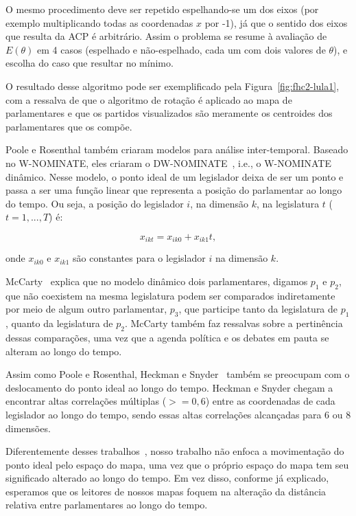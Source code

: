 \documentclass[a4paper, 12pt]{article}
\newcommand\wnominate{W-NOMINATE\xspace}
\begin{document}
O mesmo procedimento deve ser repetido espelhando-se um dos eixos (por exemplo multiplicando todas as coordenadas $x$ por -1), já que o sentido dos eixos que resulta da ACP é arbitrário. Assim o problema se resume à avaliação de $E(\theta)$ em 4 casos (espelhado e não-espelhado, cada um com dois valores de $\theta$), e escolha do caso que resultar no mínimo.

O resultado desse algoritmo pode ser exemplificado pela Figura~\ref{fig:fhc2-lula1}, com a ressalva de que o algoritmo de rotação é aplicado ao mapa de parlamentares e que os partidos visualizados são meramente os centroides dos parlamentares que os compõe.

Poole e Rosenthal também criaram modelos para análise inter-temporal. Baseado no \wnominate, eles criaram o DW-NOMINATE~\cite{poole2001dnomiante}, i.e., o \wnominate dinâmico. Nesse modelo, o ponto ideal de um legislador deixa de ser um ponto e passa a ser uma função linear que representa a posição do parlamentar ao longo do tempo. Ou seja, a posição do legislador $i$, na dimensão $k$, na legislatura $t$ ($t=1,...,T$) é:

\begin{equation}
x_{ikt} = x_{ik0} + x_{ik1}t,
\label{eq:dwnominate}
\end{equation}

onde $x_{ik0}$ e $x_{ik1}$ são constantes para o legislador $i$ na dimensão $k$.

McCarty~\cite{mccarty2011measuring} explica que no modelo dinâmico dois parlamentares, digamos $p_1$ e $p_2$, que não coexistem na mesma legislatura podem ser comparados indiretamente por meio de algum outro parlamentar, $p_3$, que participe tanto da legislatura de $p_1$, quanto da legislatura de $p_2$. McCarty também faz ressalvas sobre a pertinência dessas comparações, uma vez que a agenda política e os debates em pauta se alteram ao longo do tempo.

Assim como Poole e Rosenthal, Heckman e Snyder~\cite{heckman-snyder1997} também se preocupam com o deslocamento do ponto ideal ao longo do tempo. Heckman e Snyder chegam a encontrar altas correlações múltiplas ($>= 0,6$) entre as coordenadas de cada legislador ao longo do tempo, sendo essas altas correlações alcançadas para 6 ou 8 dimensões. 

Diferentemente desses trabalhos~\cite{poole2001dnomiante, heckman-snyder1997}, nosso trabalho não enfoca a movimentação do ponto ideal pelo espaço do mapa, uma vez que o próprio espaço do mapa tem seu significado alterado ao longo do tempo. Em vez disso, conforme já explicado, esperamos que os leitores de nossos mapas foquem na alteração da distância relativa entre parlamentares ao longo do tempo.
\end{document}
